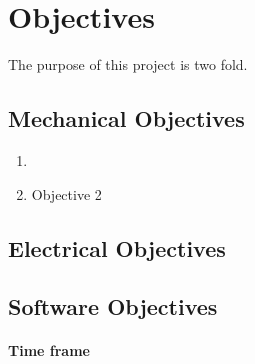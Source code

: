 \section{Objectives}
The purpose of this project is two fold.
\subsection*{Mechanical Objectives}
\begin{enumerate}
  \item{}
  \item{Objective 2}
\end{enumerate}

\subsection*{Electrical Objectives}

\subsection*{Software Objectives}

\paragraph{Time frame}
